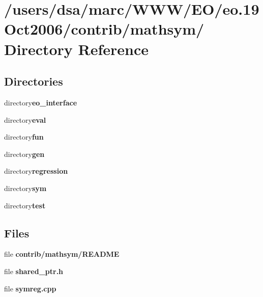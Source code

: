 \section{/users/dsa/marc/WWW/EO/eo.19Oct2006/contrib/mathsym/ Directory Reference}
\label{dir_000008}
\subsection*{Directories}
\begin{CompactItemize}
\item 
directory{\bf eo\_\-interface}
\item 
directory{\bf eval}
\item 
directory{\bf fun}
\item 
directory{\bf gen}
\item 
directory{\bf regression}
\item 
directory{\bf sym}
\item 
directory{\bf test}
\end{CompactItemize}
\subsection*{Files}
\begin{CompactItemize}
\item 
file {\bf contrib/mathsym/README}
\item 
file {\bf shared_ptr.h}
\item 
file {\bf symreg.cpp}
\end{CompactItemize}
